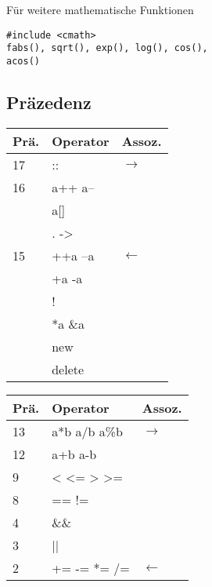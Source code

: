 Für weitere mathematische Funktionen
\begin{lstlisting}
#include <cmath>
fabs(), sqrt(), exp(), log(), cos(),
acos()
\end{lstlisting}
\subsection{Präzedenz}

\begin{multicols}{2}
\begin{tabular}{p{}|p{}|p{}}
	Prä. & Operator & Assoz.\\ \hline 
	17 & :: & $\rightarrow$\\
	16 & a++ a-- & \\
	& a[] & \\
	& . -> & \\
	15 & ++a --a & $\leftarrow$\\
	 & +a -a & \\
	 &! & \\
	 & *a \&a & \\
	 & new  & \\
	 & delete & 
\end{tabular}
\begin{tabular}{p{}|p{}|p{}}
	Prä. & Operator & Assoz.\\ \hline 
	 13& a*b a/b a\%b & $\rightarrow$\\	
	 12 & a+b a-b &\\
	 9 & < <= > >= & \\
	 8 & == != &\\
	 4 & \&\& & \\
	 3 & || & \\
	 2 & += -= *= /= &$\leftarrow$
\end{tabular}
\end{multicols}













